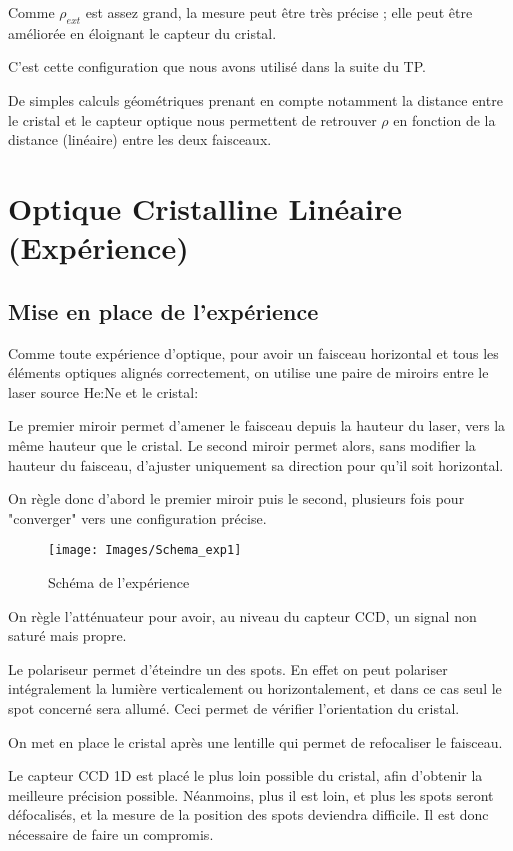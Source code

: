 \documentclass[a4paper,11pt]{report}
\begin{document}
Comme $\rho_{ext}$ est assez grand, la mesure peut être très précise ; elle peut être améliorée en éloignant le capteur du cristal.

C'est cette configuration que nous avons utilisé dans la suite du TP.

De simples calculs géométriques prenant en compte notamment la distance entre le cristal et le capteur optique nous permettent de retrouver $\rho$ en fonction de la distance (linéaire) entre les deux faisceaux.

\chapter{Optique Cristalline Linéaire (Expérience)} \label{OCLExp}
\section{Mise en place de l'expérience}
Comme toute expérience d'optique, pour avoir un faisceau horizontal et tous les éléments optiques alignés correctement, on utilise une paire de miroirs entre le laser source He:Ne et le cristal: 

Le premier miroir permet d'amener le faisceau depuis la hauteur du laser, vers la même hauteur que le cristal. Le second miroir permet alors, sans modifier la hauteur du faisceau, d'ajuster uniquement sa direction pour qu'il soit horizontal.

On règle donc d'abord le premier miroir puis le second, plusieurs fois pour "converger" vers une configuration précise.

\begin{figure}[h]
    \begin{center}
        \texttt{[image: Images/Schema\_exp1]}
        \caption{Schéma de l'expérience}
        \label{schema_exp1}
    \end{center}
\end{figure}

On règle l'atténuateur pour avoir, au niveau du capteur CCD, un signal non saturé mais propre.

Le polariseur permet d'éteindre un des spots. En effet on peut polariser intégralement la lumière verticalement ou horizontalement, et dans ce cas seul le spot concerné sera allumé. Ceci permet de vérifier l'orientation du cristal.

On met en place le cristal après une lentille qui permet de refocaliser le faisceau.

Le capteur CCD 1D est placé le plus loin possible du cristal, afin d'obtenir la meilleure précision possible. Néanmoins, plus il est loin, et plus les spots seront défocalisés, et la mesure de la position des spots deviendra difficile. Il est donc nécessaire de faire un compromis.
\end{document}
